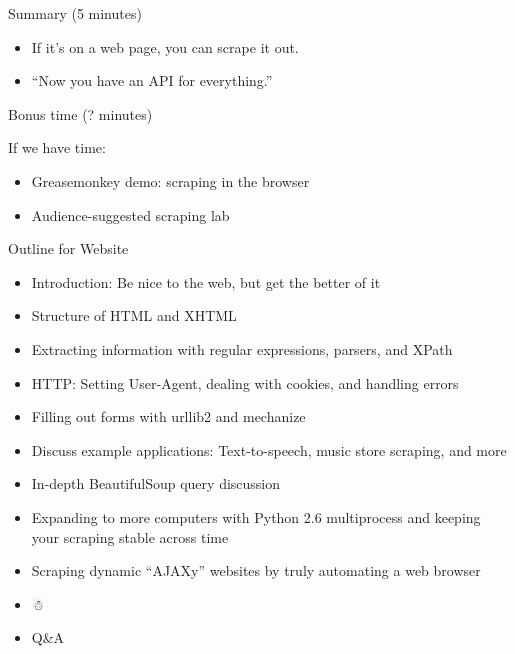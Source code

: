 \documentclass[10pt,a4paper,english]{article}
\begin{document}
\setcounter{listcnt0}{0}
\begin{list}{.}
{
\addtocounter{listcnt0}{23}
\setlength{\rightmargin}{\leftmargin}
}
\item {} 
Summary (5 minutes)

\end{list}
\begin{itemize}
\item {} 
If it's on a web page, you can scrape it out.

\item {} 
``Now you have an API for everything.''

\end{itemize}
\setcounter{listcnt0}{0}
\begin{list}{.}
{
\addtocounter{listcnt0}{24}
\setlength{\rightmargin}{\leftmargin}
}
\item {} 
Bonus time (? minutes)

\end{list}

If we have time:
\begin{itemize}
\item {} 
Greasemonkey demo: scraping in the browser

\item {} 
Audience-suggested scraping lab

\end{itemize}

Outline for Website
\begin{itemize}
\item {} 
Introduction: Be nice to the web, but get the better of it

\item {} 
Structure of HTML and XHTML

\item {} 
Extracting information with regular expressions, parsers, and XPath

\item {} 
HTTP: Setting User-Agent, dealing with cookies, and handling errors

\item {} 
Filling out forms with urllib2 and mechanize

\item {} 
Discuss example applications: Text-to-speech, music store scraping, and more

\item {} 
In-depth BeautifulSoup query discussion

\item {} 
Expanding to more computers with Python 2.6 multiprocess and keeping your scraping stable across time

\item {} 
Scraping dynamic ``AJAXy'' websites by truly automating a web browser

\item {} 
☃

\item {} 
Q{\&}A

\end{itemize}
\end{document}
